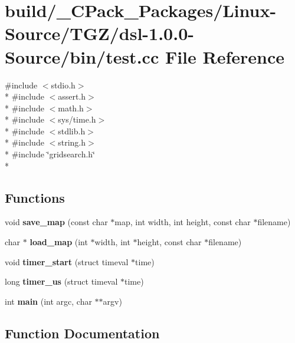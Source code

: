 \section{build/\-\_\-\-C\-Pack\-\_\-\-Packages/\-Linux-\/\-Source/\-T\-G\-Z/dsl-\/1.0.0-\/\-Source/bin/test.cc File Reference}
\label{build_2__CPack__Packages_2Linux-Source_2TGZ_2dsl-1_80_80-Source_2bin_2test_8cc}
{\ttfamily \#include $<$stdio.\-h$>$}\\*
{\ttfamily \#include $<$assert.\-h$>$}\\*
{\ttfamily \#include $<$math.\-h$>$}\\*
{\ttfamily \#include $<$sys/time.\-h$>$}\\*
{\ttfamily \#include $<$stdlib.\-h$>$}\\*
{\ttfamily \#include $<$string.\-h$>$}\\*
{\ttfamily \#include \char`\"{}gridsearch.\-h\char`\"{}}\\*
\subsection*{Functions}
\begin{DoxyCompactItemize}
\item 
void {\bf save\-\_\-map} (const char $\ast$map, int width, int height, const char $\ast$filename)
\item 
char $\ast$ {\bf load\-\_\-map} (int $\ast$width, int $\ast$height, const char $\ast$filename)
\item 
void {\bf timer\-\_\-start} (struct timeval $\ast$time)
\item 
long {\bf timer\-\_\-us} (struct timeval $\ast$time)
\item 
int {\bf main} (int argc, char $\ast$$\ast$argv)
\end{DoxyCompactItemize}


\subsection{Function Documentation}
